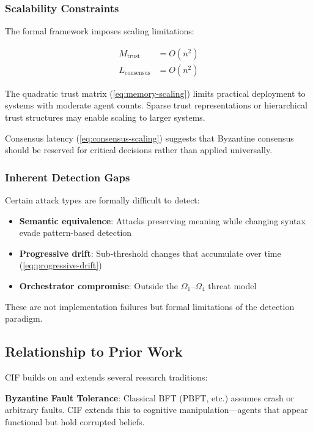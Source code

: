 \documentclass[
]{article}
\providecommand{\tightlist}{%
  \setlength{\itemsep}{0pt}\setlength{\parskip}{0pt}}
\begin{document}
\subsubsection{Scalability Constraints}\label{scalability-constraints}

The formal framework imposes scaling limitations:

\begin{align}
\label{eq:memory-scaling}
M_{\text{trust}} &= O(n^2) \\
\label{eq:consensus-scaling}
L_{\text{consensus}} &= O(n^2)
\end{align}

The quadratic trust matrix (\cref{eq:memory-scaling}) limits practical
deployment to systems with moderate agent counts. Sparse trust
representations or hierarchical trust structures may enable scaling to
larger systems.

Consensus latency (\cref{eq:consensus-scaling}) suggests that Byzantine
consensus should be reserved for critical decisions rather than applied
universally.

\subsubsection{Inherent Detection Gaps}\label{inherent-detection-gaps}

Certain attack types are formally difficult to detect:

\begin{itemize}
\tightlist
\item
  \textbf{Semantic equivalence}: Attacks preserving meaning while
  changing syntax evade pattern-based detection
\item
  \textbf{Progressive drift}: Sub-threshold changes that accumulate over
  time (\cref{eq:progressive-drift})
\item
  \textbf{Orchestrator compromise}: Outside the
  \(\Omega_1\)--\(\Omega_4\) threat model
\end{itemize}

These are not implementation failures but formal limitations of the
detection paradigm.

\subsection{Relationship to Prior Work}\label{sec:related-work}

CIF builds on and extends several research traditions:

\textbf{Byzantine Fault Tolerance}: Classical BFT (PBFT, etc.) assumes
crash or arbitrary faults. CIF extends this to cognitive
manipulation---agents that appear functional but hold corrupted beliefs.
\end{document}
